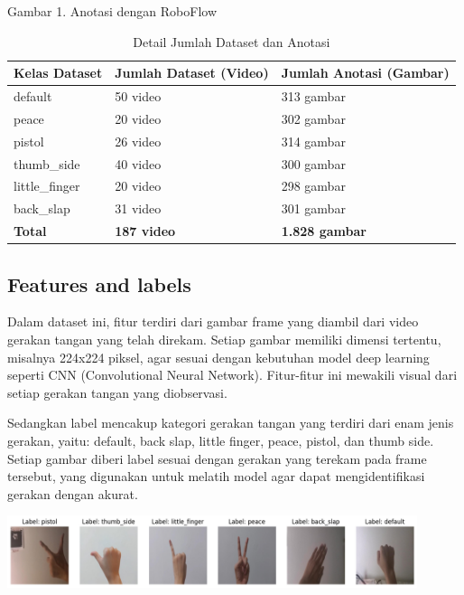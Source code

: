\documentclass[12pt,a4paper]{article}
\begin{document}
\begin{center}
    Gambar 1.  Anotasi dengan RoboFlow
\end{center}

\begin{table}[ht]
\centering
\begin{tabular}{|l|l|l|}
\hline
\textbf{Kelas Dataset} & \textbf{Jumlah Dataset (Video)} & \textbf{Jumlah Anotasi (Gambar)} \\ \hline
default       & 50 video  & 313 gambar  \\ \hline
peace         & 20 video  & 302 gambar  \\ \hline
pistol        & 26 video  & 314 gambar  \\ \hline
thumb\_side   & 40 video  & 300 gambar  \\ \hline
little\_finger & 20 video  & 298 gambar  \\ \hline
back\_slap    & 31 video  & 301 gambar  \\ \hline
\textbf{Total} & \textbf{187 video} & \textbf{1.828 gambar} \\ \hline
\end{tabular}
\caption{Detail Jumlah Dataset dan Anotasi}
\label{tab:dataset}
\end{table}

\subsection{Features and labels}
Dalam dataset ini, fitur terdiri dari gambar frame yang diambil dari video gerakan tangan yang telah direkam. Setiap gambar memiliki dimensi tertentu, misalnya 224x224 piksel, agar sesuai dengan kebutuhan model deep learning seperti CNN (Convolutional Neural Network). Fitur-fitur ini mewakili visual dari setiap gerakan tangan yang diobservasi.

Sedangkan label mencakup kategori gerakan tangan yang terdiri dari enam jenis gerakan, yaitu: default, back slap, little finger, peace, pistol, dan thumb side. Setiap gambar diberi label sesuai dengan gerakan yang terekam pada frame tersebut, yang digunakan untuk melatih model agar dapat mengidentifikasi gerakan dengan akurat.

\begin{center}
    \includegraphics[width=0.9\textwidth]{images/2.png}
\end{center}
\end{document}
